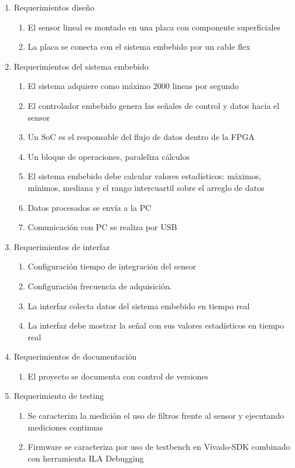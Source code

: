 \documentclass[
11pt, %
codirector, %
]{charter}
\begin{document}
\begin{enumerate}
	\item Requerimientos diseño
		\begin{enumerate}
			\item El sensor lineal es montado en una placa con componente superficiales
			\item La placa se conecta con el sistema embebido por un cable flex
		\end{enumerate}
		
	\item Requerimientos del sistema embebido
		\begin{enumerate}
			\item El sistema adquiere como máximo 2000 lineas por segundo
			\item El controlador embebido genera las señales de control y datos hacia el sensor
			\item Un SoC es el responsable del flujo de datos dentro de la FPGA
			\item Un bloque de operaciones, paraleliza cálculos
			\item El sistema embebido debe calcular valores estadísticos: máximos, mínimos, mediana y el rango intercuartil sobre el arreglo de datos
			\item Datos procesados se envía a la PC
			\item Comunicación con PC se realiza por USB
		\end{enumerate}
	\item Requerimientos de interfaz
		\begin{enumerate}
			\item Configuración tiempo de integración del sensor
			\item Configuración frecuencia de adquisición.
			\item La interfaz colecta datos del sistema embebido en tiempo real
			\item La interfaz debe mostrar la señal con sus valores estadísticos en tiempo real
		\end{enumerate}
	\item Requerimientos de documentación
		\begin{enumerate}
			\item El proyecto se documenta con control de versiones 
		\end{enumerate}
	\item Requerimiento de testing
	\begin{enumerate}
			\item Se caracteriza la medición el uso de filtros frente al sensor y ejecutando mediciones continuas
			\item Firmware se caracteriza por uso de testbench en Vivado-SDK combinado con herramienta ILA Debugging
		\end{enumerate}
	

\end{enumerate}
\end{document}
